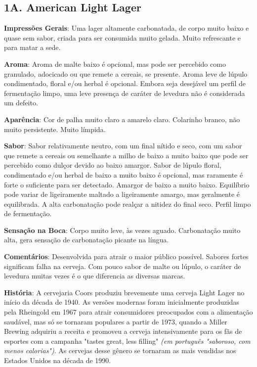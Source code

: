 \subsection*{1A. American Light Lager}
\textbf{Impressões Gerais}: Uma lager altamente carbonatada, de corpo muito baixo e quase sem sabor, criada para ser consumida muito gelada. Muito refrescante e para matar a sede.

\textbf{Aroma}: Aroma de malte baixo é opcional, mas pode ser percebido como granulado, adocicado ou que remete a cereais, se presente. Aroma leve de lúpulo condimentado, floral e/ou herbal é opcional. Embora seja desejável um perfil de fermentação limpo, uma leve presença de caráter de levedura não é considerada um defeito.

\textbf{Aparência}: Cor de palha muito claro a amarelo claro. Colarinho branco, não muito persistente. Muito límpida.

\textbf{Sabor}: Sabor relativamente neutro, com um final nítido e seco, com um sabor que remete a cereais ou semelhante a milho de baixo a muito baixo que pode ser percebido como dulçor devido ao baixo amargor. Sabor de lúpulo floral, condimentado e/ou herbal de baixo a muito baixo é opcional, mas raramente é forte o suficiente para ser detectado. Amargor de baixo a muito baixo. Equilíbrio pode variar de ligeiramente maltado a ligeiramente amargo, mas geralmente é equilibrada. A alta carbonatação pode realçar a nitidez do final seco. Perfil limpo de fermentação.

\textbf{Sensação na Boca}: Corpo muito leve, às vezes aguado. Carbonatação muito alta, gera sensação de carbonatação picante na língua.

\textbf{Comentários}: Desenvolvida para atrair o maior público possível. Sabores fortes significam falha na cerveja. Com pouco sabor de malte ou lúpulo, o caráter de levedura muitas vezes é o que diferencia as diversas marcas.

\textbf{História}: A cervejaria Coors produziu brevemente uma cerveja Light Lager no início da década de 1940. As versões modernas foram inicialmente produzidas pela Rheingold em 1967 para atrair consumidores preocupados com a alimentação saudável, mas só se tornaram populares a partir de 1973, quando a Miller Brewing adquiriu a receita e promoveu a cerveja intensivamente para os fãs de esportes com a campanha "tastes great, less filling" \textit{(em português "saboroso, com menos calorias")}. As cervejas desse gênero se tornaram as mais vendidas nos Estados Unidos na década de 1990.

